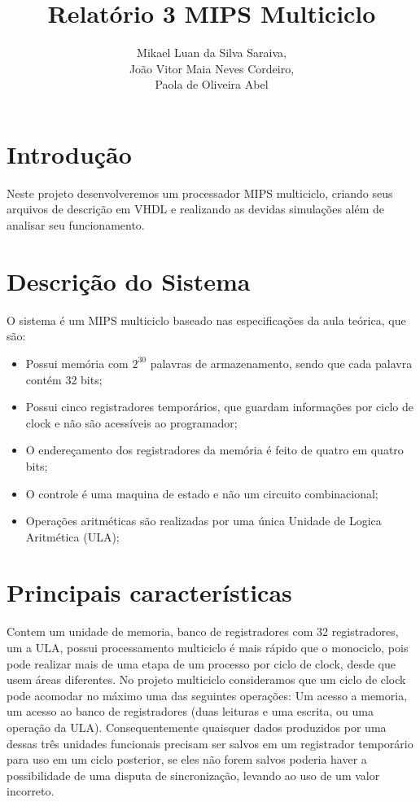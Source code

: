 \documentclass{article}
\title{Relatório 3 \- MIPS Multiciclo}
\author{%
    Mikael Luan da Silva Saraiva, \\
    João Vitor Maia Neves Cordeiro, \\
    Paola de Oliveira Abel
    }
\begin{document}
    \maketitle

    \section{Introdução}

    Neste projeto desenvolveremos um processador MIPS multiciclo, criando seus
    arquivos de descrição em VHDL e realizando as devidas simulações além de
    analisar seu funcionamento.

    \section{Descrição do Sistema}

    O sistema é um MIPS multiciclo baseado nas especificações da aula teórica,
    que são:

    \begin{itemize}
        \item Possui memória com $2^{30}$ palavras de armazenamento, sendo que
            cada palavra contém 32 bits;
        \item Possui cinco registradores temporários, que guardam informações
            por ciclo de clock e não são acessíveis ao programador;
        \item O endereçamento dos registradores da memória é feito de quatro em
            quatro bits;
        \item O controle é uma maquina de estado e não um circuito
            combinacional;
        \item Operações aritméticas são realizadas por uma única Unidade de
            Logica Aritmética (ULA);
    \end{itemize}

    \section{Principais características}

    Contem um unidade de memoria, banco de registradores com 32 registradores,
    um a ULA, possui processamento multiciclo é mais rápido que o monociclo,
    pois pode realizar mais de uma etapa de um processo por ciclo de clock,
    desde que usem áreas diferentes. No projeto multiciclo consideramos que um
    ciclo de clock pode acomodar no máximo uma das seguintes operações: Um
    acesso a memoria, um acesso ao banco de registradores (duas leituras e uma
    escrita, ou uma operação da ULA). Consequentemente quaisquer dados
    produzidos por uma dessas três unidades funcionais precisam ser salvos em
    um registrador temporário para uso em um ciclo posterior, se eles não forem
    salvos poderia haver a possibilidade de uma disputa de sincronização,
    levando ao uso de um valor incorreto.
\end{document}
